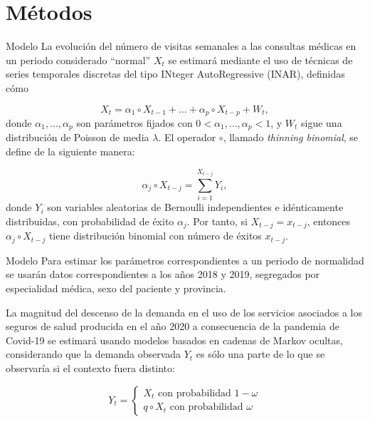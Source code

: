 \documentclass[
    10pt,
    aspectratio=169,
    usenames,
    dvipsnames
]{beamer}
\begin{document}
\section[Métodos]{Métodos}

\begin{frame}{Modelo}
La evolución del número de visitas semanales a las consultas médicas en un periodo considerado ``normal'' $X_t$ se estimará mediante el uso de técnicas de series temporales discretas del tipo INteger AutoRegressive (INAR), definidas cómo

\begin{equation}\label{eq:INAR}
  X_t = \alpha_1 \circ X_{t-1} + \ldots + \alpha_p \circ X_{t-p} + W_t,
\end{equation}
donde $\alpha_1, \ldots, \alpha_p$ son parámetros fijados con $0 < \alpha_1, \ldots, \alpha_p < 1$, y $W_t$ sigue una
distribución de Poisson de media $\lambda$. El operador $\circ$, llamado \textit{thinning binomial}, se define de la siguiente manera:

\begin{equation}\label{eq:thinning}
  \alpha_j \circ X_{t-j} = \sum_{i=1}^{X_{t-j}} Y_i,
\end{equation}
donde $Y_i$ son variables aleatorias de Bernoulli independientes e idénticamente
distribuidas, con probabilidad de éxito $\alpha_j$. Por tanto, si $X_{t-j} = x_{t-j}$, entonces $\alpha_j \circ X_{t-j}$
tiene distribución binomial con número de éxitos $x_{t-j}$.
\end{frame}

\begin{frame}{Modelo}
Para estimar los parámetros correspondientes a un periodo de normalidad se usarán datos correspondientes a los
años 2018 y 2019, segregados por especialidad médica, sexo del paciente y provincia.

La magnitud del descenso de la demanda en el uso de los servicios asociados a los
seguros de salud producida en el año 2020 a consecuencia de la pandemia de Covid-19
se estimará usando modelos basados en cadenas de Markov ocultas, considerando que
la demanda observada $Y_t$ es sólo una parte de lo que se observaría si el contexto fuera
distinto:

\begin{equation}\label{eq:model}
    Y_t=\left\{
                \begin{array}{ll}
                  X_t \text{ con probabilidad } 1-\omega \\
                  q \circ X_t \text{ con probabilidad } \omega
                \end{array}
              \right.
\end{equation}
\end{frame}
\end{document}
